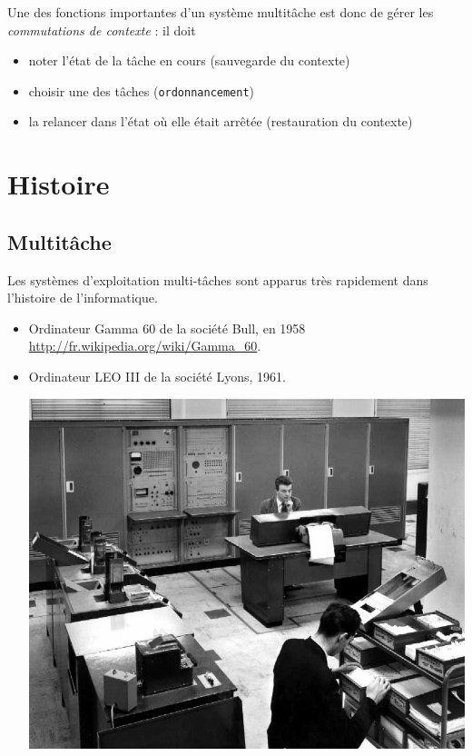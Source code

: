 \begin{multicols}{2}
Une des fonctions importantes d'un système multitâche est donc de gérer les \emph{commutations de contexte} : il doit 
\begin{itemize}
\item noter l'état de la tâche en cours (sauvegarde du contexte)
\item choisir une des tâches (\texttt{ordonnancement})
\item la relancer dans l'état où elle était arrêtée (restauration du contexte)
\end{itemize}

\section{Histoire}

\subsection{Multitâche}
Les systèmes d'exploitation multi-tâches sont apparus très rapidement dans
l'histoire de l'informatique.

\begin{itemize}
\item Ordinateur Gamma 60 de la société Bull, en 1958 \url{http://fr.wikipedia.org/wiki/Gamma_60}. 



\item Ordinateur LEO III de la société Lyons, 1961.

\begin{center}
\includegraphics[width=\linewidth]{Historique/1Leo3Operating.jpg} \\
\end{center}


\end{itemize}
\end{multicols}
